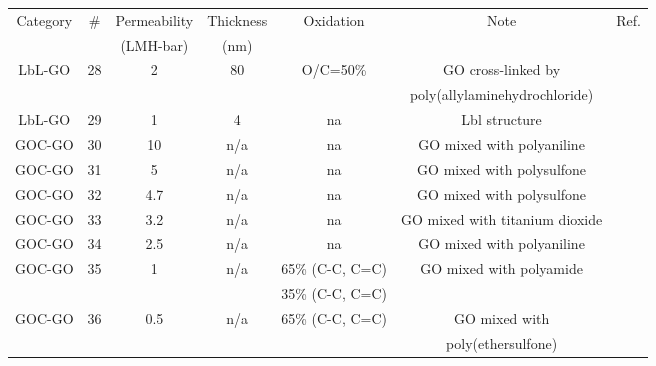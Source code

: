 \begin{table}[t!]
 \begin{center}
  \begin{tabular}{*7c}
        Category &  $\#$ & Permeability   & Thickness & Oxidation & Note & Ref.\\
         &  & (LMH-bar)  & (nm) &  & & \\
        \hline
        LbL-GO & 28 & 2 & 80 & O/C=50\% &  GO cross-linked by  & \cite{hu2014layer}\\
        & &  &  &  & poly(allylaminehydrochloride)& \\
        LbL-GO & 29 & 1 & 4 & na &  Lbl structure  & \cite{choi2013layer}\\
        \hline
        GOC-GO & 30 & 10 & n/a & na &  GO mixed with polyaniline  & \cite{akin2014green}\\
        GOC-GO & 31 & 5 & n/a & na &  GO mixed with polysulfone & \cite{ganesh2013enhanced}\\
        GOC-GO & 32 & 4.7 & n/a & na &  GO mixed with polysulfone & \cite{ganesh2013enhanced}\\
        GOC-GO & 33 & 3.2 & n/a & na &  GO mixed with titanium dioxide & \cite{safarpour2015thin}\\
        GOC-GO & 34 & 2.5 & n/a & na &  GO mixed with polyaniline  & \cite{akin2014green}\\
        GOC-GO & 35 & 1 & n/a & 65\% (C-C, C=C) &  GO mixed with polyamide  & \cite{chae2015graphene}\\
         & &  &  & 35\% (C-C, C=C) & & \\
        GOC-GO & 36 & 0.5 & n/a & 65\% (C-C, C=C) &  GO mixed with & \cite{zinadini2014preparation}\\
         & &  &  &  & poly(ethersulfone)& \\
        \end{tabular}
    \end{center}
\end{table}
\newpage
